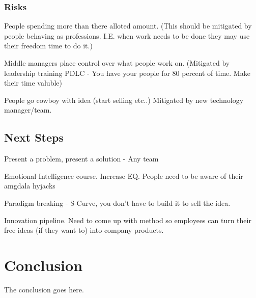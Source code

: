 \documentclass[conference]{IEEEtran}
\begin{document}
\subsubsection{Risks}
People spending more than there alloted amount. (This should be mitigated by
people behaving as professions. I.E. when work needs to be done they may use
their freedom time to do it.)

Middle managers place control over what people work on. (Mitigated by
leadership training PDLC - You have your people for 80 percent of time. Make
their time valuble)

People go cowboy with idea (start selling etc..) Mitigated by new technology
manager/team. 

\subsection{Next Steps}
Present a problem, present a solution - Any team

Emotional Intelligence course. Increase EQ. People need to be aware of their
amgdala hyjacks

Paradigm breaking - S-Curve, you don't have to build it to sell the idea.

Innovation pipeline. Need to come up with method so employees can turn their
free ideas (if they want to) into company products.

\section{Conclusion}
The conclusion goes here.
\end{document}
